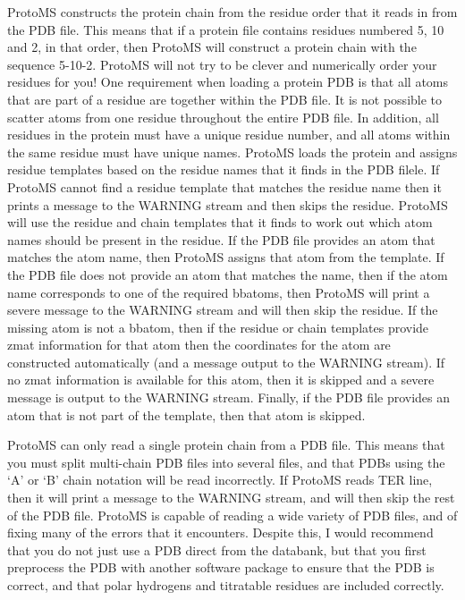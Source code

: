 \documentclass[letterpaper,10pt,english]{sphinxmanual}
\begin{document}
ProtoMS constructs the protein chain from the residue order that it reads in from the PDB file. This means that if a protein file contains residues numbered 5, 10 and 2, in that order, then ProtoMS will construct a protein chain with the sequence 5-10-2. ProtoMS will not try to be clever and numerically order your residues for you! One requirement when loading a protein PDB is that all atoms that are part of a residue are together within the PDB file. It is not possible to scatter atoms from one residue throughout the entire PDB file. In addition, all residues in the protein must have a unique residue number, and all atoms within the same residue must have unique names. ProtoMS loads the protein and assigns residue templates based on the residue names that it finds in the PDB filele. If ProtoMS cannot find a residue template that matches the residue name then it prints a message to the WARNING stream and then skips the residue. ProtoMS will use the residue and chain templates that it finds to work out which atom names should be present in the residue. If the PDB file provides an atom that matches the atom name, then ProtoMS assigns that atom from the template. If the PDB file does not provide an atom that matches the name, then if the atom name corresponds to one of the required bbatoms, then ProtoMS will print a severe message to the WARNING stream and will then skip the residue. If the missing atom is not a bbatom, then if the residue or chain templates provide zmat information for that atom then the coordinates for the atom are constructed automatically (and a message output to the WARNING stream). If no zmat information is available for this atom, then it is skipped and a severe message is output to the WARNING stream. Finally, if the PDB file provides an atom that is not part of the template, then that atom is skipped.

ProtoMS can only read a single protein chain from a PDB file. This means that you must split multi-chain PDB files into several files, and that PDBs using the ‘A’ or ‘B’ chain notation will be read incorrectly. If ProtoMS reads TER line, then it will print a message to the WARNING stream, and will then skip the rest of the PDB file. ProtoMS is capable of reading a wide variety of PDB files, and of fixing many of the errors that it encounters. Despite this, I would recommend that you do not just use a PDB direct from the databank, but that you first preprocess the PDB with another software package to ensure that the PDB is correct, and that polar hydrogens and titratable residues are included correctly.
\end{document}
